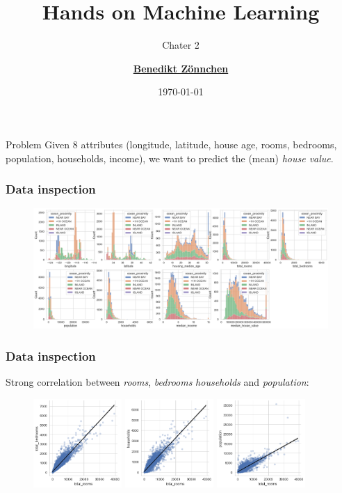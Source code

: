 \documentclass[aspectratio=169]{beamer}
\title{Hands on Machine Learning}
\subtitle{Chater 2}
\author{\href{mailto:zoennchen.benedikt@hm.edu}{\textbf{Benedikt Z\"onnchen}}}
\date{\today}
\begin{document}
	
	\begin{frame}
		\titlepage
	\end{frame}

	\begin{frame}
		\begin{block}{Problem}
			Given 8 attributes (longitude, latitude, house age, rooms, bedrooms, population, households, income), we want to predict the (mean) \textit{house value}.
		\end{block}
	\end{frame}

	\begin{frame}
		\frametitle{Data inspection}
		\begin{figure}
			\includegraphics[width=\textwidth]{./../plots/histos.png}
		\end{figure}
	\end{frame}

	\begin{frame}
		\frametitle{Data inspection}
		Strong correlation between \textit{rooms}, \textit{bedrooms} \textit{households} and \textit{population}:
		\begin{figure}
			\includegraphics[width=0.30\textwidth]{./../plots/rooms_bedrooms.png}
			\includegraphics[width=0.30\textwidth]{./../plots/rooms_households.png}
			\includegraphics[width=0.30\textwidth]{./../plots/rooms_population.png}
		\end{figure}
	\end{frame}
\end{document}
